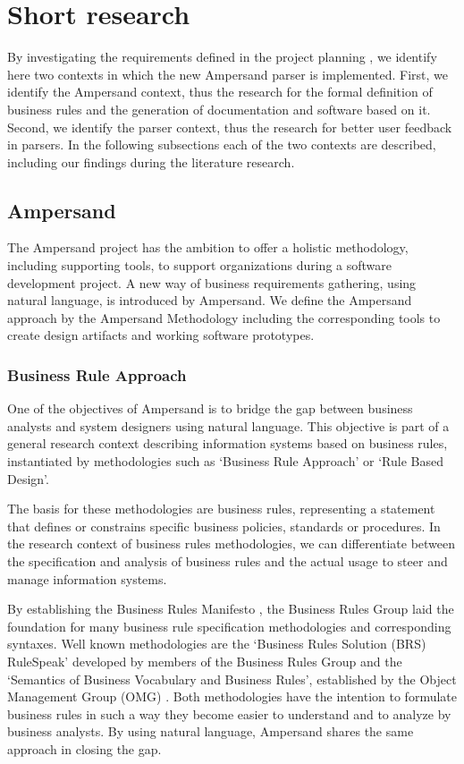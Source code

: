 
\section{Short research}
\label{sec:research}
By investigating the requirements defined in the project planning , we identify here two contexts in which the new Ampersand parser is implemented.
First, we identify the Ampersand context, thus the research for the formal definition of business rules and the generation of documentation and software based  on it.
Second, we identify the parser context, thus the research for better user feedback in parsers.
In the following subsections each of the two contexts are described, including our findings during the literature research.

\subsection{Ampersand}
The Ampersand project has the ambition to offer a holistic methodology, including supporting tools, to support organizations during a software development project.
A new way of business requirements gathering, using natural language, is introduced by Ampersand.
We define the Ampersand approach by the Ampersand Methodology including the corresponding tools to create design artifacts and working software prototypes.

\subsubsection{Business Rule Approach}
One of  the objectives of Ampersand is to bridge the gap between business analysts and system designers using natural language.
This objective is part of a general research context describing information systems based on business rules, instantiated by methodologies such as `Business Rule Approach' or `Rule Based Design'.

The basis for these methodologies are business rules, representing a statement that defines or constrains specific business policies, standards or procedures.
In the research context of business rules methodologies, we can differentiate between the specification and analysis of business rules and the actual usage to steer and manage information systems.

%
%
By establishing the Business Rules Manifesto , the Business Rules Group laid the foundation for many business rule specification methodologies and corresponding syntaxes.
Well known methodologies are the `Business Rules Solution (BRS) RuleSpeak' developed by members of the Business Rules Group  and the `Semantics of Business Vocabulary and Business Rules', established by the Object Management Group (OMG) .
Both methodologies have the intention to formulate business rules in such a way they become easier to understand and to analyze by business analysts.
By using natural language, Ampersand shares the same approach in closing the gap.

